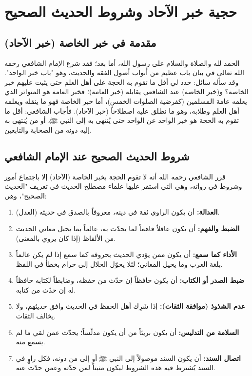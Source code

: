 \chapter{حجية خبر الآحاد وشروط الحديث الصحيح}

\section{مقدمة في خبر الخاصة (خبر الآحاد)}
الحمد لله والصلاة والسلام على رسول الله، أما بعد؛ فقد شرع الإمام الشافعي رحمه الله تعالى في بيان باب عظيم من أبواب أصول الفقه والحديث، وهو "باب خبر الواحد".
وقد سأله سائل: حدد لي أقل ما تقوم به الحجة على أهل العلم حتى يثبت عليهم خبر الخاصة؟ 
و(خبر الخاصة) عند الشافعي يقابله (خبر العامة)؛ فخبر العامة هو المتواتر الذي يعلمه عامة المسلمين (كفرضية الصلوات الخمس)، أما خبر الخاصة فهو ما ينقله ويعلمه أهل العلم وطلابه، وهو ما نطلق عليه اصطلاحاً (خبر الآحاد).
فأجاب الشافعي: أقل ما تقوم به الحجة هو خبر الواحد عن الواحد حتى يُنتهى به إلى النبي ﷺ، أو من يُنتهى به إليه دونه من الصحابة والتابعين.

\section{شروط الحديث الصحيح عند الإمام الشافعي}
قرر الشافعي رحمه الله أنه لا تقوم الحجة بخبر الخاصة (الآحاد) إلا باجتماع أمور وشروط في رواته، وهي التي استقر عليها علماء مصطلح الحديث في تعريف "الحديث الصحيح"، وهي:
\begin{enumerate}
    \item \textbf{العدالة:} أن يكون الراوي ثقة في دينه، معروفاً بالصدق في حديثه (العدل).
    \item \textbf{الضبط والفهم:} أن يكون عاقلاً فاهماً لما يحدّث به، عالماً بما يحيل معاني الحديث من الألفاظ (إذا كان يروي بالمعنى).
    \item \textbf{الأداء كما سمع:} أن يكون ممن يؤدي الحديث بحروفه كما سمع إذا لم يكن عالماً بلغة العرب وما يحيل المعاني؛ لئلا يحوّل الحلال إلى حرام بخطأ في اللفظ.
    \item \textbf{ضبط الصدر أو الكتاب:} أن يكون حافظاً إن حدّث من حفظه، وضابطاً لكتابه حافظاً له إن حدّث من كتابه.
    \item \textbf{عدم الشذوذ (موافقة الثقات):} إذا شَرِك أهل الحفظ في الحديث وافق حديثهم، ولا يخالف الثقات.
    \item \textbf{السلامة من التدليس:} أن يكون بريئاً من أن يكون مدلّساً؛ يحدّث عمن لقي ما لم يسمع منه.
    \item \textbf{اتصال السند:} أن يكون السند موصولاً إلى النبي ﷺ أو إلى من دونه، فكل راوٍ في السند يُشترط فيه هذه الشروط ليكون مثبتاً لمن حدّثه وعمن حدّث عنه.
\end{enumerate}

